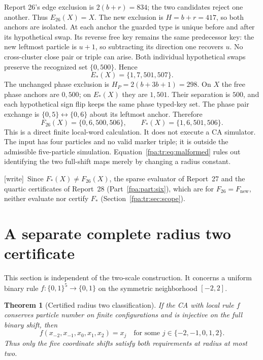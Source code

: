 \documentclass[11pt,a4paper]{article}
\numberwithin{equation}{section}
\newtheorem{theorem}{Theorem}[section]
\newcommand{\Estar}{E_*}\newcommand{\Fstar}{F_*}
\newcommand{\Etwosix}{E_{26}}\newcommand{\Ptwosix}{P_{26}}\newcommand{\Ftwosix}{F_{26}}
\newcommand{\wtag}{\textup{[write]}}
\begin{document}
Report 26's edge exclusion is $2(b+r)=834$; the two candidates reject one another. Thus $\Etwosix(X)=X$. The new exclusion is $H=b+r=417$, so both anchors are isolated. At each anchor the guarded type is unique before and after its hypothetical swap. Its reverse free key remains the same predecessor key: the new leftmost particle is $u+1$, so subtracting its direction one recovers $u$. No cross-cluster close pair or triple can arise. Both individual hypothetical swaps preserve the recognized set $\{0,500\}$. Hence
\[
\Estar(X)=\{1,7,501,507\}.
\]
The unchanged phase exclusion is $H_P=2(b+3b+1)=298$. On $X$ the free phase anchors are $0,500$; on $\Estar(X)$ they are $1,501$. Their separation is $500$, and each hypothetical sign flip keeps the same phase typed-key set. The phase pair exchange is $\{0,5\}\leftrightarrow\{0,6\}$ about its leftmost anchor. Therefore
\begin{equation}\label{fpa:tr:eq:malformed}
\Ftwosix(X)=\{0,6,500,506\},\qquad
\Fstar(X)=\{1,6,501,506\}.
\end{equation}
This is a direct finite local-word calculation. It does not execute a CA simulator. The input has four particles and no valid marker triple; it is outside the admissible five-particle simulation. Equation~\eqref{fpa:tr:eq:malformed} rules out identifying the two full-shift maps merely by changing a radius constant.

\wtag\ Since $\Fstar(X)\ne\Ftwosix(X)$, the sparse evaluator of Report~27 and the quartic certificates of Report~28 (Part~\ref{fpa:part:six}), which are for $\Ftwosix=F_{\mathrm{new}}$, neither evaluate nor certify $\Fstar$ (Section~\ref{fpa:tr:sec:scope}).
\section{A separate complete radius two certificate}\label{fpa:tr:sec:radius-two}
This section is independent of the two-scale construction. It concerns a uniform binary rule $f:\{0,1\}^5\to\{0,1\}$ on the symmetric neighborhood $[-2,2]$.

\begin{theorem}[Certified radius two classification]\label{fpa:tr:thm:radius-two}
If the CA with local rule $f$ conserves particle number on finite configurations and is injective on the full binary shift, then
\[
f(x_{-2},x_{-1},x_0,x_1,x_2)=x_j
\quad\text{for some }j\in\{-2,-1,0,1,2\}.
\]
Thus only the five coordinate shifts satisfy both requirements at radius at most two.
\end{theorem}
\end{document}
